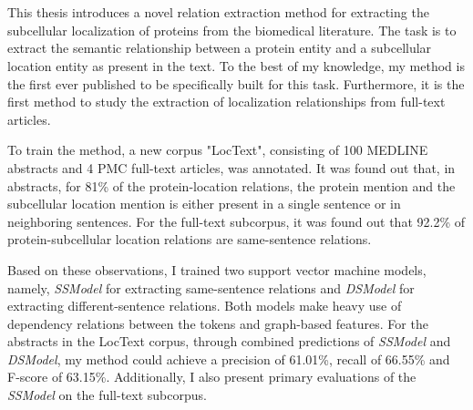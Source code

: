 \chapter{\abstractname}


This thesis introduces a novel relation extraction method for extracting the subcellular localization of proteins from the biomedical literature. The task is to extract the semantic relationship between a protein entity and a subcellular location entity as present in the text. To the best of my knowledge, my method is the first ever published to be specifically built for this task. Furthermore, it is the first method to study the extraction of localization relationships from full-text articles.

To train the method, a new corpus "LocText", consisting of 100 MEDLINE abstracts and 4 PMC full-text articles, was annotated. It was found out that, in abstracts, for 81\% of the protein-location relations, the protein mention and the subcellular location mention is either present in a single sentence or in neighboring sentences. For the full-text subcorpus, it was found out that 92.2\% of protein-subcellular location relations are same-sentence relations.

Based on these observations, I trained two support vector machine models, namely, \textit{SSModel} for extracting same-sentence relations and \textit{DSModel} for extracting different-sentence relations. Both models make heavy use of dependency relations between the tokens and graph-based features. For the abstracts in the LocText corpus, through combined predictions of \textit{SSModel} and \textit{DSModel}, my method could achieve a precision of 61.01\%, recall of 66.55\% and F-score of 63.15\%. Additionally, I also present primary evaluations of the \textit{SSModel} on the full-text subcorpus.